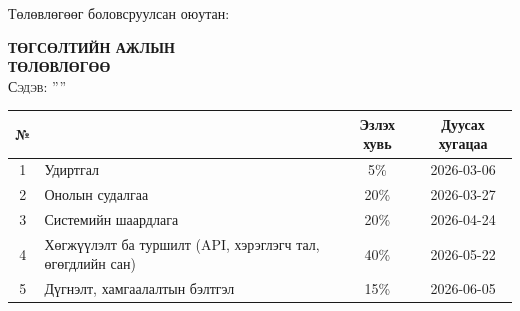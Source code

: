 
\begin{titlepage}

\vspace*{0.5cm}
\noindent Төлөвлөгөөг боловсруулсан оюутан: {\shortname}

\begin{center}

\vspace{1.5cm}
\textbf{{\large ТӨГСӨЛТИЙН АЖЛЫН \\ ТӨЛӨВЛӨГӨӨ}}\\[0.5cm]

\textsc{\large Сэдэв: ''\ttitle''}\\[0.5cm]

\begin{tabular}{|c|p{8cm}|c|c|}
	\hline
	\rowcolor{lightlightgray}
	№ & \makebox[8cm][c]{Ажлын бүлэг, хэсгүүдийн нэр} & Эзлэх хувь & Дуусах хугацаа \\ \hline
	1 & Удиртгал & 5\%  & 2026-03-06 \\ \hline
	2 & Онолын судалгаа & 20\% & 2026-03-27 \\ \hline
	3 & Системийн шаардлага & 20\% & 2026-04-24 \\ \hline
	4 & Хөгжүүлэлт ба туршилт (API, хэрэглэгч тал, өгөгдлийн сан) & 40\% & 2026-05-22 \\ \hline
	5 & Дүгнэлт, хамгаалалтын бэлтгэл & 15\% & 2026-06-05 \\ \hline
\end{tabular}

\end{center}
\end{titlepage}


\newpage

